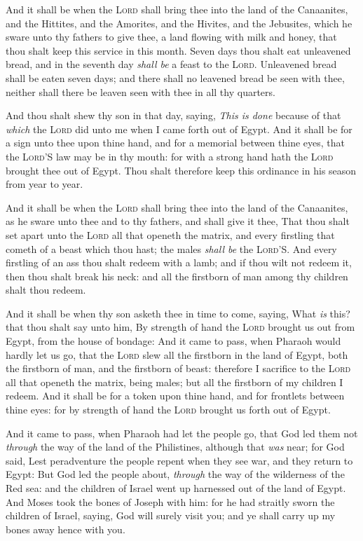 \documentclass[11pt,letterpaper,oneside]{memoir}
\begin{document}
And it shall be when the \textsc{Lord} shall bring thee into the land of
the Canaanites, and the Hittites, and the Amorites, and the Hivites, and
the Jebusites, which he sware unto thy fathers to give thee, a land
flowing with milk and honey, that thou shalt keep this service in this
month. Seven days thou shalt eat unleavened bread, and in the seventh
day \emph{shall be} a feast to the \textsc{Lord}. Unleavened bread shall
be eaten seven days; and there shall no leavened bread be seen with
thee, neither shall there be leaven seen with thee in all thy quarters.

And thou shalt shew thy son in that day, saying, \emph{This is done} because
of that \emph{which} the \textsc{Lord} did unto me when I came forth out
of Egypt. And it shall be for a sign unto thee upon thine hand, and for
a memorial between thine eyes, that the \textsc{Lord}'S law may be in
thy mouth: for with a strong hand hath the \textsc{Lord} brought thee
out of Egypt. Thou shalt therefore keep this ordinance in his season
from year to year.

And it shall be when the \textsc{Lord} shall bring thee into the land of
the Canaanites, as he sware unto thee and to thy fathers, and shall give
it thee, That thou shalt set apart unto the \textsc{Lord} all that
openeth the matrix, and every firstling that cometh of a beast which
thou hast; the males \emph{shall be} the \textsc{Lord}'S. And every
firstling of an ass thou shalt redeem with a lamb; and if thou wilt not
redeem it, then thou shalt break his neck: and all the firstborn of man
among thy children shalt thou redeem.

And it shall be when thy son asketh thee in time to come, saying, What
\emph{is} this? that thou shalt say unto him, By strength of hand the
\textsc{Lord} brought us out from Egypt, from the house of bondage: And
it came to pass, when Pharaoh would hardly let us go, that the
\textsc{Lord} slew all the firstborn in the land of Egypt, both the
firstborn of man, and the firstborn of beast: therefore I sacrifice to
the \textsc{Lord} all that openeth the matrix, being males; but all the
firstborn of my children I redeem. And it shall be for a token upon
thine hand, and for frontlets between thine eyes: for by strength of
hand the \textsc{Lord} brought us forth out of Egypt.

And it came to pass, when Pharaoh had let the people go, that God led
them not \emph{through} the way of the land of the Philistines, although
that \emph{was} near; for God said, Lest peradventure the people repent
when they see war, and they return to Egypt: But God led the people
about, \emph{through} the way of the wilderness of the Red sea: and the
children of Israel went up harnessed out of the land of Egypt. And Moses
took the bones of Joseph with him: for he had straitly sworn the
children of Israel, saying, God will surely visit you; and ye shall
carry up my bones away hence with you.
\end{document}

